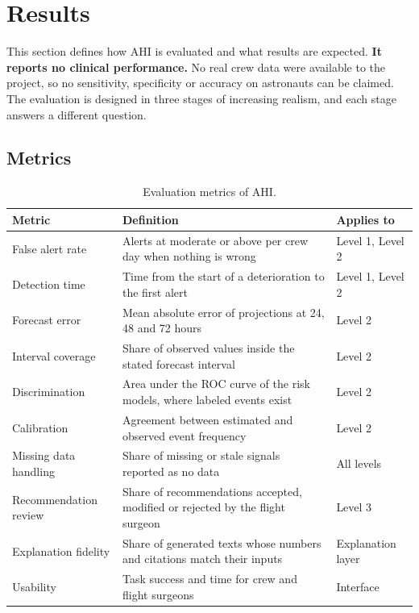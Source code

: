 \section{Results}
\label{sec:results}

This section defines how AHI is evaluated and what results are expected. \textbf{It reports no clinical performance.} No real crew data were available to the project, so no sensitivity, specificity or accuracy on astronauts can be claimed. The evaluation is designed in three stages of increasing realism, and each stage answers a different question.

\subsection{Metrics}
\label{subsec:metrics}

\begin{table}[htbp]
\centering
\vspace{0.8em}
\caption{Evaluation metrics of AHI.}
\label{tab:checks}
\small
\begin{tabular}{p{4.0cm}p{6.0cm}p{4.0cm}}
\hline
\textbf{Metric} & \textbf{Definition} & \textbf{Applies to} \\
\hline
False alert rate & Alerts at moderate or above per crew day when nothing is wrong & Level 1, Level 2 \\
Detection time & Time from the start of a deterioration to the first alert & Level 1, Level 2 \\
Forecast error & Mean absolute error of projections at 24, 48 and 72 hours & Level 2 \\
Interval coverage & Share of observed values inside the stated forecast interval & Level 2 \\
Discrimination & Area under the ROC curve of the risk models, where labeled events exist & Level 2 \\
Calibration & Agreement between estimated and observed event frequency & Level 2 \\
Missing data handling & Share of missing or stale signals reported as no data & All levels \\
Recommendation review & Share of recommendations accepted, modified or rejected by the flight surgeon & Level 3 \\
Explanation fidelity & Share of generated texts whose numbers and citations match their inputs & Explanation layer \\
Usability & Task success and time for crew and flight surgeons & Interface \\
\hline
\end{tabular}
\vspace{1.2em}
\end{table}

